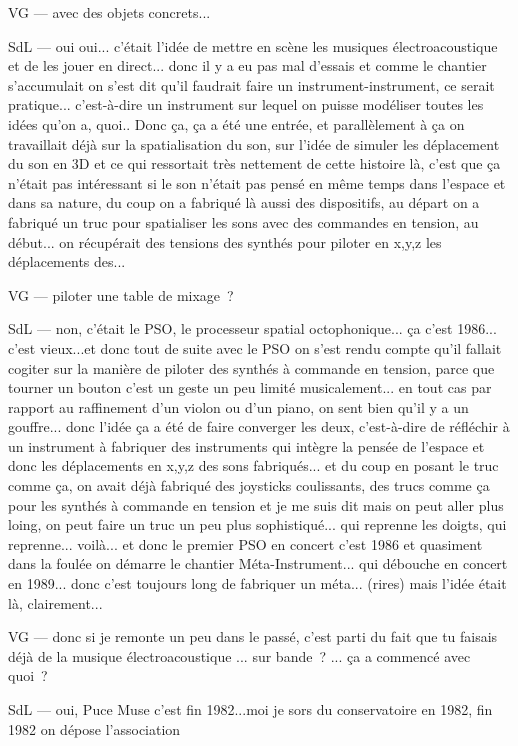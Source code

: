 VG — avec des objets concrets... 

SdL — oui oui... c'était l'idée de mettre en scène les musiques électroacoustique et de les jouer en direct... donc il y a eu pas mal d'essais et comme le chantier s'accumulait on s'est dit qu'il faudrait faire un instrument-instrument, ce serait pratique... c'est-à-dire un instrument sur lequel on puisse modéliser toutes les idées qu'on a, quoi.. Donc ça, ça a été une entrée, et parallèlement à ça on travaillait déjà sur la spatialisation du son, sur l'idée de simuler les déplacement du son en 3D et ce qui ressortait très nettement de cette histoire là, c'est que ça n'était pas intéressant si le son n'était pas pensé en même temps dans l'espace et dans sa nature, du coup on a fabriqué là aussi des dispositifs, au départ on a fabriqué un truc pour spatialiser les sons avec des commandes en tension, au début... on récupérait des tensions des synthés pour piloter en x,y,z les déplacements des... 

VG — piloter une table de mixage ? 

SdL — non, c'était le PSO, le processeur spatial octophonique... ça c'est 1986... c'est vieux...et donc tout de suite avec le PSO on s'est rendu compte qu'il fallait cogiter sur la manière de piloter des synthés à commande en tension, parce que tourner un bouton c'est un geste un peu limité musicalement... en tout cas par rapport au raffinement d'un violon ou d'un piano, on sent bien qu'il y a un gouffre... donc l'idée ça a été de faire converger les deux, c'est-à-dire de réfléchir à un instrument à fabriquer des instruments qui intègre la pensée de l'espace et donc les déplacements en x,y,z des sons fabriqués... et du coup en posant le truc comme ça, on avait déjà fabriqué des joysticks coulissants, des trucs comme ça pour les synthés à commande en tension et je me suis dit mais on peut aller plus loing, on peut faire un truc un peu plus sophistiqué... qui reprenne les doigts, qui reprenne... voilà... et donc le premier PSO en concert c'est 1986 et quasiment dans la foulée on démarre le chantier Méta-Instrument... qui débouche en concert en 1989... donc c'est toujours long de fabriquer un méta... (rires) mais l'idée était là, clairement... 

VG — donc si je remonte un peu dans le passé, c'est parti du fait que tu faisais déjà de la musique électroacoustique ... sur bande ? ... ça a commencé avec quoi ? 

SdL — oui, Puce Muse c'est fin 1982...moi je sors du conservatoire en 1982, fin 1982 on dépose l'association 

